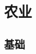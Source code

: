 \documentclass[UTF8]{ApplicationUniverse}
\begin{document}






\chapter{农业}

\section{基础}
\end{document}
